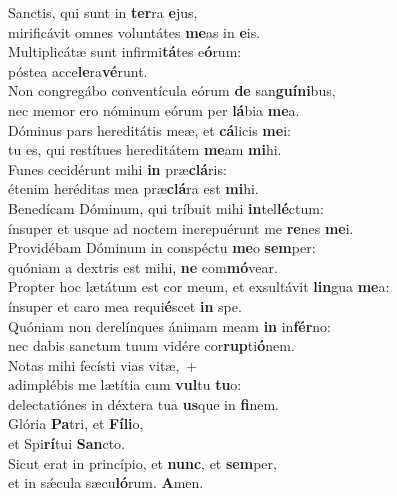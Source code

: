 \evenverse Sanctis, qui sunt in \textbf{ter}ra \textbf{e}jus,~\*\\
\evenverse mirificávit omnes voluntátes \textbf{me}as in \textbf{e}is.\\
\oddverse Multiplicátæ sunt infirmi\textbf{tá}tes e\textbf{ó}rum:~\*\\
\oddverse póstea acce\textbf{le}ra\textbf{vé}runt.\\
\evenverse Non congregábo conventícula eórum \textbf{de} san\textbf{guí}\textbf{ni}bus,~\*\\
\evenverse nec memor ero nóminum eórum per \textbf{lá}bia \textbf{me}a.\\
\oddverse Dóminus pars hereditátis meæ, et \textbf{cá}licis \textbf{me}i:~\*\\
\oddverse tu es, qui restítues hereditátem \textbf{me}am \textbf{mi}hi.\\
\evenverse Funes cecidérunt mihi \textbf{in} præ\textbf{clá}ris:~\*\\
\evenverse étenim heréditas mea præ\textbf{clá}ra est \textbf{mi}hi.\\
\oddverse Benedícam Dóminum, qui tríbuit mihi \textbf{in}tel\textbf{lé}ctum:~\*\\
\oddverse ínsuper et usque ad noctem increpuérunt me \textbf{re}nes \textbf{me}i.\\
\evenverse Providébam Dóminum in conspéctu \textbf{me}o \textbf{sem}per:~\*\\
\evenverse quóniam a dextris est mihi, \textbf{ne} com\textbf{mó}vear.\\
\oddverse Propter hoc lætátum est cor meum, et exsultávit \textbf{lin}gua \textbf{me}a:~\*\\
\oddverse ínsuper et caro mea requi\textbf{é}scet \textbf{in} spe.\\
\evenverse Quóniam non derelínques ánimam meam \textbf{in} in\textbf{fér}no:~\*\\
\evenverse nec dabis sanctum tuum vidére cor\textbf{rup}ti\textbf{ó}nem.\\
\oddverse Notas mihi fecísti vias vitæ,~+\\
\oddverse  adimplébis me lætítia cum \textbf{vul}tu \textbf{tu}o:~\*\\
\oddverse delectatiónes in déxtera tua \textbf{us}que in \textbf{fi}nem.\\
\evenverse Glória \textbf{Pa}tri, et \textbf{Fí}\textbf{li}o,~\*\\
\evenverse et Spi\textbf{rí}tui \textbf{San}cto.\\
\oddverse Sicut erat in princípio, et \textbf{nunc}, et \textbf{sem}per,~\*\\
\oddverse et in sǽcula sæcu\textbf{ló}rum. \textbf{A}men.\\
